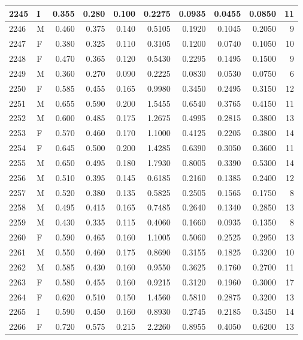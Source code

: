 \documentclass[9pt,twocolumn,twoside,]{pnas-new}
\begin{document}
\begin{tabular}{l|l|r|r|r|r|r|r|r|r}
\hline
2245 & I & 0.355 & 0.280 & 0.100 & 0.2275 & 0.0935 & 0.0455 & 0.0850 & 11\\
\hline
2246 & M & 0.460 & 0.375 & 0.140 & 0.5105 & 0.1920 & 0.1045 & 0.2050 & 9\\
\hline
2247 & F & 0.380 & 0.325 & 0.110 & 0.3105 & 0.1200 & 0.0740 & 0.1050 & 10\\
\hline
2248 & F & 0.470 & 0.365 & 0.120 & 0.5430 & 0.2295 & 0.1495 & 0.1500 & 9\\
\hline
2249 & M & 0.360 & 0.270 & 0.090 & 0.2225 & 0.0830 & 0.0530 & 0.0750 & 6\\
\hline
2250 & F & 0.585 & 0.455 & 0.165 & 0.9980 & 0.3450 & 0.2495 & 0.3150 & 12\\
\hline
2251 & M & 0.655 & 0.590 & 0.200 & 1.5455 & 0.6540 & 0.3765 & 0.4150 & 11\\
\hline
2252 & M & 0.600 & 0.485 & 0.175 & 1.2675 & 0.4995 & 0.2815 & 0.3800 & 13\\
\hline
2253 & F & 0.570 & 0.460 & 0.170 & 1.1000 & 0.4125 & 0.2205 & 0.3800 & 14\\
\hline
2254 & F & 0.645 & 0.500 & 0.200 & 1.4285 & 0.6390 & 0.3050 & 0.3600 & 11\\
\hline
2255 & M & 0.650 & 0.495 & 0.180 & 1.7930 & 0.8005 & 0.3390 & 0.5300 & 14\\
\hline
2256 & M & 0.510 & 0.395 & 0.145 & 0.6185 & 0.2160 & 0.1385 & 0.2400 & 12\\
\hline
2257 & M & 0.520 & 0.380 & 0.135 & 0.5825 & 0.2505 & 0.1565 & 0.1750 & 8\\
\hline
2258 & M & 0.495 & 0.415 & 0.165 & 0.7485 & 0.2640 & 0.1340 & 0.2850 & 13\\
\hline
2259 & M & 0.430 & 0.335 & 0.115 & 0.4060 & 0.1660 & 0.0935 & 0.1350 & 8\\
\hline
2260 & F & 0.590 & 0.465 & 0.160 & 1.1005 & 0.5060 & 0.2525 & 0.2950 & 13\\
\hline
2261 & M & 0.550 & 0.460 & 0.175 & 0.8690 & 0.3155 & 0.1825 & 0.3200 & 10\\
\hline
2262 & M & 0.585 & 0.430 & 0.160 & 0.9550 & 0.3625 & 0.1760 & 0.2700 & 11\\
\hline
2263 & F & 0.580 & 0.455 & 0.160 & 0.9215 & 0.3120 & 0.1960 & 0.3000 & 17\\
\hline
2264 & F & 0.620 & 0.510 & 0.150 & 1.4560 & 0.5810 & 0.2875 & 0.3200 & 13\\
\hline
2265 & I & 0.590 & 0.450 & 0.160 & 0.8930 & 0.2745 & 0.2185 & 0.3450 & 14\\
\hline
2266 & F & 0.720 & 0.575 & 0.215 & 2.2260 & 0.8955 & 0.4050 & 0.6200 & 13\\

\end{tabular}
\end{document}
